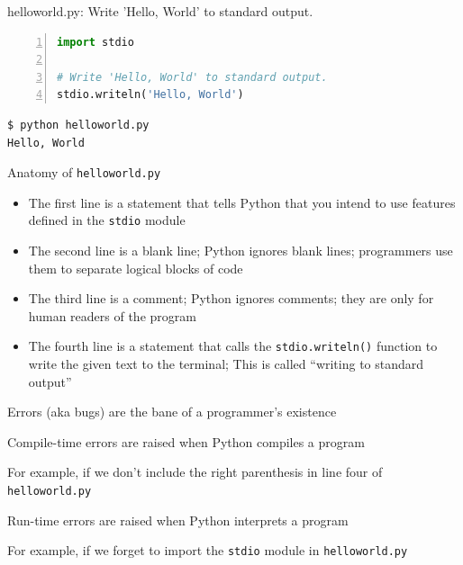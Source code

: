 \documentclass[8pt,a4paper,compress]{beamer}
\begin{document}
\begin{frame}[fragile]
\pause

\begin{framed}
\tiny helloworld.py: Write 'Hello, World' to standard output.
\end{framed}

\begin{lstlisting}[language=Python,numbers=left]
import stdio

# Write 'Hello, World' to standard output.
stdio.writeln('Hello, World')
\end{lstlisting}

\pause

\begin{lstlisting}[language={}]
$ python helloworld.py 
Hello, World
\end{lstlisting}

\pause
\bigskip

Anatomy of \lstinline{helloworld.py}
\begin{itemize}
\item The first line is a statement that tells Python that you intend to use features defined in the \lstinline{stdio} module
 
\item The second line is a blank line; Python ignores blank lines; programmers use them to separate logical blocks of code

\item The third line is a comment; Python ignores comments; they are only for human readers of the program

\item The fourth line is a statement that calls the \lstinline{stdio.writeln()} function to write the given text to the terminal; This is called ``writing to standard output''
\end{itemize}
\end{frame}

\begin{frame}[fragile]
\pause

Errors (aka bugs) are the bane of a programmer's existence

\pause
\bigskip

Compile-time errors are raised when Python compiles a program

\pause
\bigskip

For example, if we don't include the right parenthesis in line four of \lstinline{helloworld.py}

\pause
\bigskip

Run-time errors are raised when Python interprets a program

\pause
\bigskip

For example, if we forget to import the \lstinline{stdio} module in \lstinline{helloworld.py}
\end{frame}
\end{document}
